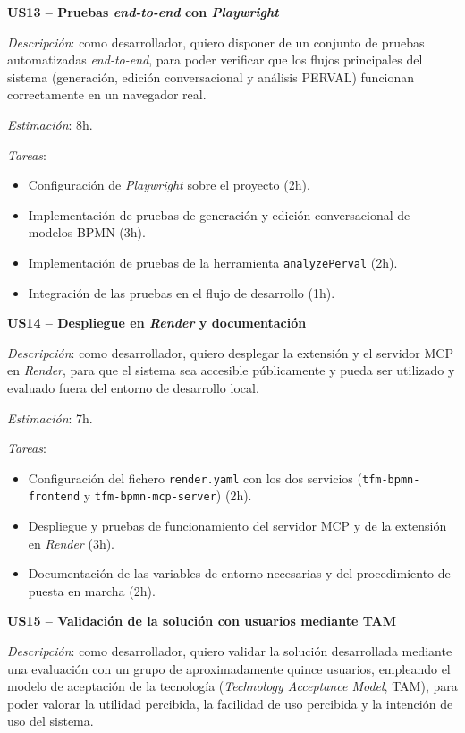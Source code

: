 {\textbf{US13 -- Pruebas \textit{end-to-end} con \textit{Playwright}}

\textit{Descripción}: como desarrollador, quiero disponer de un conjunto de pruebas automatizadas \textit{end-to-end}, para poder verificar que los flujos principales del sistema (generación, edición conversacional y análisis PERVAL) funcionan correctamente en un navegador real.

\textit{Estimación}: 8h.

\textit{Tareas}:
\begin{itemize}
    \item Configuración de \textit{Playwright} sobre el proyecto (2h).
    \item Implementación de pruebas de generación y edición conversacional de modelos BPMN (3h).
    \item Implementación de pruebas de la herramienta \texttt{analyzePerval} (2h).
    \item Integración de las pruebas en el flujo de desarrollo (1h).
\end{itemize}


\textbf{US14 -- Despliegue en \textit{Render} y documentación}

\textit{Descripción}: como desarrollador, quiero desplegar la extensión y el servidor MCP en \textit{Render}, para que el sistema sea accesible públicamente y pueda ser utilizado y evaluado fuera del entorno de desarrollo local.

\textit{Estimación}: 7h.

\textit{Tareas}:
\begin{itemize}
    \item Configuración del fichero \texttt{render.yaml} con los dos servicios (\texttt{tfm-bpmn-frontend} y \texttt{tfm-bpmn-mcp-server}) (2h).
    \item Despliegue y pruebas de funcionamiento del servidor MCP y de la extensión en \textit{Render} (3h).
    \item Documentación de las variables de entorno necesarias y del procedimiento de puesta en marcha (2h).
\end{itemize}

\textbf{US15 -- Validación de la solución con usuarios mediante TAM}

\textit{Descripción}: como desarrollador, quiero validar la solución desarrollada mediante una evaluación con un grupo de aproximadamente quince usuarios, empleando el modelo de aceptación de la tecnología (\textit{Technology Acceptance Model}, TAM), para poder valorar la utilidad percibida, la facilidad de uso percibida y la intención de uso del sistema.

}
